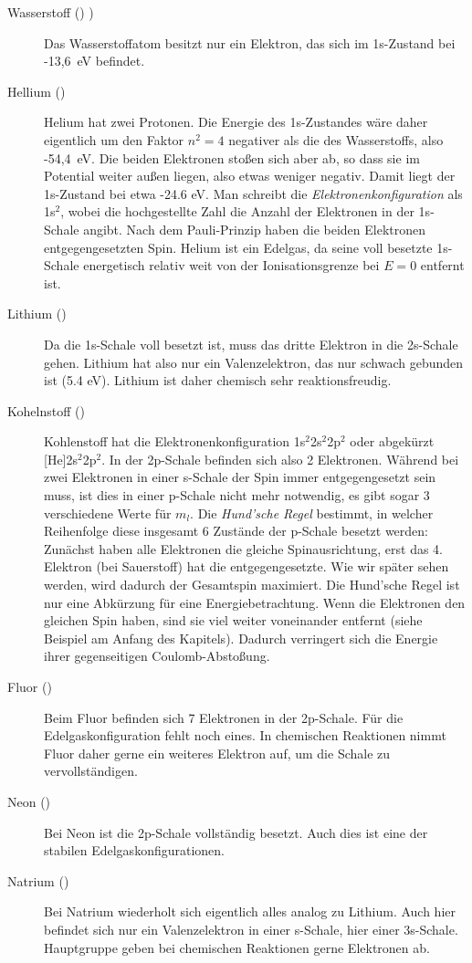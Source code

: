 \begin{description}
    \item[Wasserstoff () )] Das Wasserstoffatom besitzt nur ein Elektron, das sich im 1s-Zustand bei -13,6~eV befindet.
  
  \item[Hellium ()] Helium hat zwei Protonen. Die Energie des 1s-Zustandes wäre daher eigentlich um den Faktor $n^2 = 4$ negativer als die des Wasserstoffs, also -54,4~eV. Die beiden Elektronen stoßen sich aber ab, so dass sie im Potential weiter außen liegen, also etwas weniger negativ. Damit liegt der 1s-Zustand bei etwa -24.6 eV. Man schreibt die \emph{Elektronenkonfiguration} als 1s$^2$, wobei die hochgestellte Zahl die Anzahl der Elektronen in der 1s-Schale angibt. Nach dem Pauli-Prinzip haben die beiden Elektronen entgegengesetzten Spin. Helium ist ein Edelgas, da seine voll besetzte 1s-Schale energetisch relativ weit von der Ionisationsgrenze bei $E=0$ entfernt ist.
   
    \item[Lithium ()] Da die 1s-Schale voll besetzt ist, muss das dritte Elektron in die 2s-Schale gehen. Lithium hat also nur ein Valenzelektron, das nur schwach gebunden ist (5.4 eV). Lithium ist daher chemisch sehr reaktionsfreudig.
    
    \item[Kohelnstoff ()]   Kohlenstoff hat die Elektronenkonfiguration 1s$^2$2s$^2$2p$^2$ oder abgekürzt [He]2s$^2$2p$^2$. In der 2p-Schale befinden sich also 2 Elektronen. Während bei zwei Elektronen in einer s-Schale der Spin immer entgegengesetzt sein muss, ist dies in einer p-Schale nicht mehr notwendig, es gibt sogar 3 verschiedene Werte für $m_l$. Die \emph{Hund'sche Regel} bestimmt, in welcher Reihenfolge diese insgesamt 6 Zustände der p-Schale besetzt werden: Zunächst haben alle Elektronen die gleiche Spinausrichtung, erst das 4. Elektron (bei Sauerstoff) hat die entgegengesetzte. Wie wir später sehen werden, wird dadurch der Gesamtspin maximiert. Die Hund'sche Regel ist nur eine Abkürzung für eine Energiebetrachtung. Wenn die Elektronen den gleichen Spin haben, sind sie viel weiter voneinander entfernt (siehe Beispiel am Anfang des Kapitels). Dadurch verringert sich die Energie ihrer gegenseitigen Coulomb-Abstoßung.
    
    \item[Fluor ()] Beim Fluor befinden sich 7 Elektronen in der 2p-Schale. Für die Edelgaskonfiguration fehlt noch eines. In chemischen Reaktionen nimmt Fluor daher gerne ein weiteres Elektron auf, um die Schale zu vervollständigen.

    \item[Neon ()]  Bei Neon ist die 2p-Schale vollständig besetzt. Auch dies ist eine der stabilen Edelgaskonfigurationen.
    
    \item[Natrium ()] Bei Natrium wiederholt sich eigentlich alles analog zu Lithium. Auch hier befindet sich nur ein Valenzelektron in einer s-Schale, hier einer 3s-Schale. Hauptgruppe geben bei chemischen Reaktionen gerne Elektronen ab.
\end{description}

